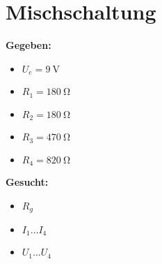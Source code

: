 \documentclass[12pt,a4paper]{amsart}
\begin{document}
\section{Mischschaltung}
\textbf{Gegeben:}
\begin{itemize}
\item $U_e = \qty{9}{\volt}$
\item $R_1 = \qty{180}{\ohm}$
\item $R_2 = \qty{180}{\ohm}$
\item $R_3 = \qty{470}{\ohm}$
\item $R_4 = \qty{820}{\ohm}$
\end{itemize}
\textbf{Gesucht:}
\begin{itemize}
\item $R_g$
\item $I_1 \dots I_4$
\item $U_1 \dots U_4$
\end{itemize}
\end{document}
